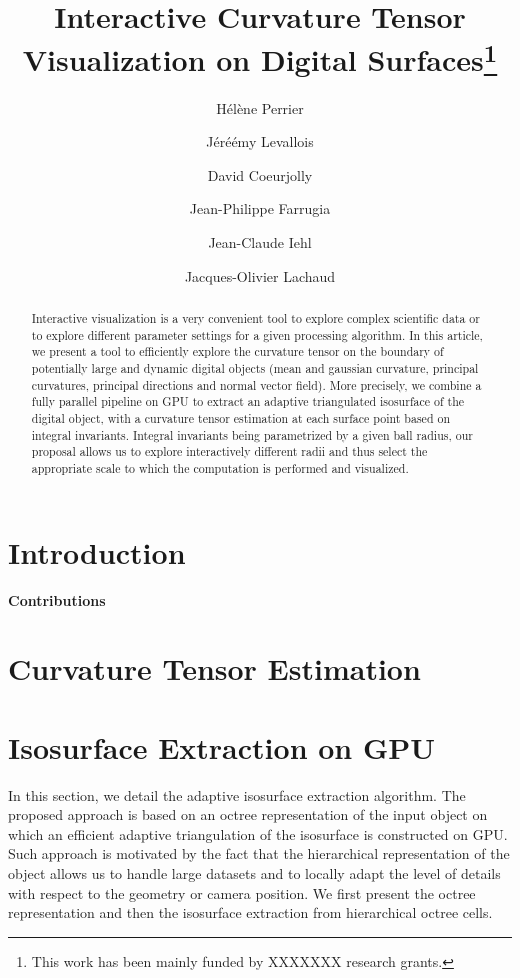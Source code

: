 \documentclass{llncs}
\title{Interactive Curvature Tensor Visualization on Digital
Surfaces\thanks{This work has been mainly funded by XXXXXXX research grants.}}
\author{H\'el\`ene Perrier\inst{1}\and J\'eré\'emy Levallois\inst{1,2}\and David
Coeurjolly\inst{1}\and Jean-Philippe Farrugia\inst{1}\and Jean-Claude
Iehl\inst{1}\and Jacques-Olivier Lachaud\inst{2} }
\institute{ Universit\'e de Lyon, CNRS\\
   LIRIS, UMR5205, F-69621, France
   \and
Universit\'e de Savoie, CNRS\\
LAMA, UMR5127, F-73776, France\\
}
\begin{document}
\maketitle


\begin{abstract}\sloppy
  Interactive visualization is a very convenient tool to explore
  complex scientific data or to explore different parameter settings
  for a given processing algorithm. In this article, we present a tool
  to efficiently explore the curvature tensor on the boundary of
  potentially large and dynamic digital objects (mean and gaussian curvature,
  principal curvatures, principal directions and normal vector
  field). More precisely, we combine a fully parallel pipeline on GPU
  to extract an adaptive triangulated isosurface of the digital
  object, with a curvature tensor estimation at each surface point
  based on integral invariants. Integral invariants being parametrized
  by a given ball radius, our proposal allows us to explore
  interactively different radii and thus select the appropriate scale
  to which the computation is performed and visualized.


\end{abstract}

\section{Introduction}
\label{sec:introduction}



\textbf{Contributions}




\section{Curvature Tensor Estimation}
\label{sec:curv-tens-estim}


\section{Isosurface Extraction on GPU}
\label{sec:isos-extr-gpu}

In this section, we detail the adaptive isosurface extraction
algorithm. The proposed approach is based on an octree representation
of the input object on which an efficient adaptive triangulation
of the isosurface is constructed on GPU. Such approach is motivated by
the fact that the hierarchical representation of the object allows us
to handle large datasets and to locally adapt the level of details
with respect to the geometry or camera position. We first present the
octree representation and then the isosurface extraction from
hierarchical octree cells.
\end{document}
